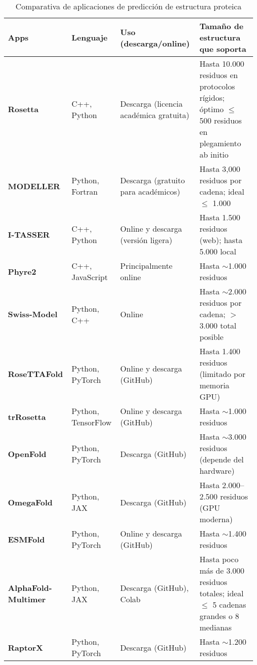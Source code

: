 \documentclass[11pt,a4paper]{article}
\begin{document}
  \begin{table}[H]
    \centering
    \begin{tabular}{|p{4cm}|p{3cm}|p{4cm}|p{4cm}|}
      \hline
      \textbf{Apps} & \textbf{Lenguaje} & \textbf{Uso (descarga/online)} & \textbf{Tamaño de estructura que soporta} \\
      \hline
      \textbf{Rosetta} & C++, Python & Descarga (licencia académica gratuita) & Hasta 10.000 residuos en protocolos rígidos; óptimo $\leq$ 500 residuos en plegamiento ab initio \\
      \hline
      \textbf{MODELLER} & Python, Fortran & Descarga (gratuito para académicos) & Hasta 3,000 residuos por cadena; ideal $\leq$ 1.000 \\
      \hline
      \textbf{I-TASSER} & C++, Python & Online y descarga (versión ligera) & Hasta 1.500 residuos (web); hasta 5.000 local \\
      \hline
      \textbf{Phyre2} & C++, JavaScript & Principalmente online & Hasta $\sim$1.000 residuos \\
      \hline
      \textbf{Swiss-Model} & Python, C++ & Online & Hasta $\sim$2.000 residuos por cadena; $>$3.000 total posible \\
      \hline
      \textbf{RoseTTAFold} & Python, PyTorch & Online y descarga (GitHub) & Hasta 1.400 residuos (limitado por memoria GPU) \\
      \hline
      \textbf{trRosetta} & Python, TensorFlow & Online y descarga (GitHub) & Hasta $\sim$1.000 residuos \\
      \hline
      \textbf{OpenFold} & Python, PyTorch & Descarga (GitHub) & Hasta $\sim$3.000 residuos (depende del hardware) \\
      \hline
      \textbf{OmegaFold} & Python, JAX & Descarga (GitHub) & Hasta 2.000--2.500 residuos (GPU moderna) \\
      \hline
      \textbf{ESMFold} & Python, PyTorch & Online y descarga (GitHub) & Hasta $\sim$1.400 residuos \\
      \hline
      \textbf{AlphaFold-Multimer} & Python, JAX & Descarga (GitHub), Colab & Hasta poco más de 3.000 residuos totales; ideal $\leq$ 5 cadenas grandes o 8 medianas \\
      \hline
      \textbf{RaptorX} & Python, PyTorch & Descarga (GitHub) & Hasta $\sim$1.200 residuos \\
      \hline
    \end{tabular}
    \caption{Comparativa de aplicaciones de predicción de estructura proteica}
    \label{tab:comparativa_apps}
  \end{table}
  
\end{document}
